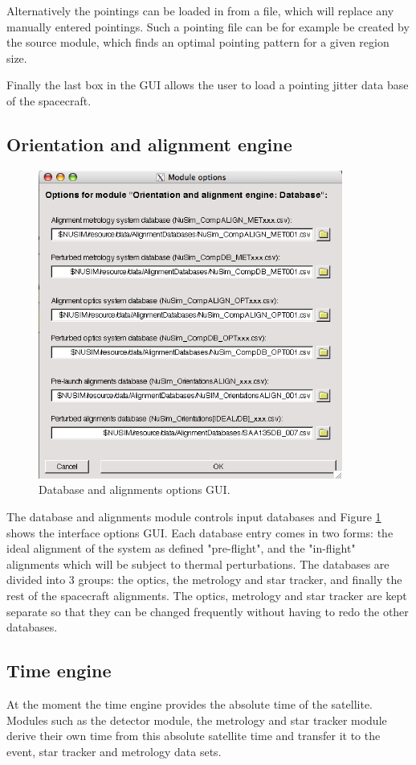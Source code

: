 Alternatively the pointings can be loaded in from a file, which will replace any manually entered pointings. Such a pointing file can be for example be created by the source module, which finds an optimal pointing pattern for a given region size.

Finally the last box in the GUI allows the user to load a pointing jitter data base of the spacecraft. 

\subsection{Orientation and alignment engine}
\begin{figure}[tb]
\begin{center}
\includegraphics[width=10cm]{images/DBgui.png}  
\caption{Database and alignments options GUI.}
\label{dbgui} 
\end{center}
\end{figure}

The database and alignments module controls input databases and Figure \ref{dbgui} shows the interface options GUI. Each database entry comes in two forms: the ideal alignment of the system as defined "pre-flight", and the "in-flight" alignments which will be subject to thermal perturbations. The databases are divided into 3 groups: the optics, the metrology and star tracker, and finally the rest of the spacecraft alignments. The optics, metrology and star tracker are kept separate so that they can be changed frequently without having to redo the other databases.

\subsection{Time engine}
At the moment the time engine provides the absolute time of the satellite. Modules such as the detector module, the metrology and star tracker module derive their own time from this absolute satellite time and transfer it to the event, star tracker and metrology data sets.   

